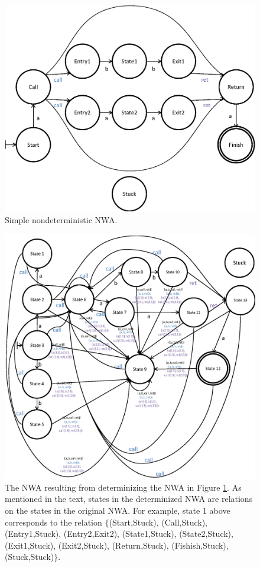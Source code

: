 \documentclass{llncs}
\begin{document}
\begin{figure}[p]
  \centering
    \includegraphics[width=12cm]{Figures/Figure16.eps}
  \caption{Simple nondeterministic NWA.}
  \label{Fig:Det1}
\end{figure}


\begin{figure}[p]
  \centering
    \includegraphics[width=16cm]{Figures/Figure17.eps}
    \caption{The NWA resulting from determinizing the NWA in Figure \ref{Fig:Det1}. As mentioned in the text, states in the determinized NWA are relations on the states in the original NWA. For example, state 1 above corresponds to the relation $\{$(Start,Stuck), (Call,Stuck), (Entry1,Stuck), (Entry2,Exit2), (State1,Stuck), (State2,Stuck), (Exit1,Stuck), (Exit2,Stuck), (Return,Stuck), (Fishish,Stuck), (Stuck,Stuck)$\}$.}
 
  \label{Fig:Det2}
\end{figure}
\end{document}
